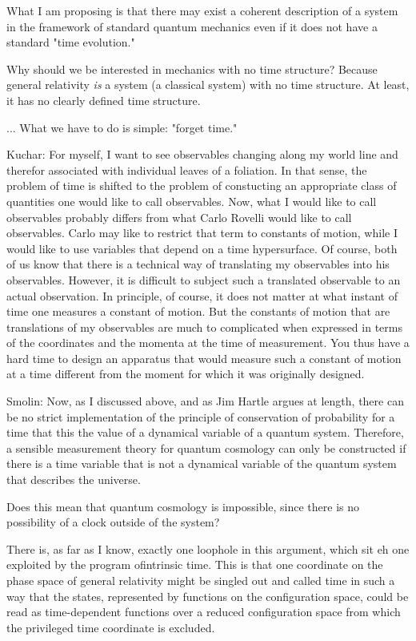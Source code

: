 What I am proposing is that there may exist a coherent
description of a system in the framework of standard quantum
mechanics even if it does not have a standard "time evolution." 

Why should we be interested in mechanics with no time structure? 
Because general relativity \emph{is} a system (a classical system)
with no time structure.  At least, it has no clearly defined time
structure.  

... What we have to do is simple: "forget time."

Kuchar: For myself, I want to see observables changing along my
world line and therefor associated with individual leaves of a
foliation.  In that sense, the problem of time is shifted to the
problem of constucting an appropriate class of quantities one
would like to call observables.  Now, what I would like to call
observables probably differs from what Carlo Rovelli would like
to call observables.  Carlo may like to restrict that term to
constants of motion, while I would like to use variables that
depend on a time hypersurface.  Of course, both of us know that
there is a technical way of translating my observables into his
observables.  However, it is difficult to subject such a
translated observable to an actual observation.  In principle, of
course, it does not matter at what instant of time one measures a
constant of motion.  But the constants of motion that are
translations of my observables are much to complicated when
expressed in terms of the coordinates and the momenta at the time
of measurement.  You thus have a hard time to design an apparatus
that would measure such a constant of motion at a time different
from the moment for which it was originally designed. 

Smolin: Now, as I discussed above, and as Jim Hartle argues at
length, there can be no strict implementation of the principle of
conservation of probability for a time that this the value of a
dynamical variable of a quantum system.  Therefore, a sensible
measurement theory for quantum cosmology can only be constructed
if there is a time variable that is not a dynamical variable of
the quantum system that describes the universe.

Does this mean that quantum cosmology is impossible, since there
is no possibility of a clock outside of the system?

There is, as far as I know, exactly one loophole in this
argument, which sit eh one exploited by the program ofintrinsic
time.  This is that one coordinate on the phase space of general
relativity might be singled out and called time in such a way
that the states, represented by functions on the configuration
space, could be read as time-dependent functions over a reduced
configuration space from which the privileged time coordinate is
excluded.  

